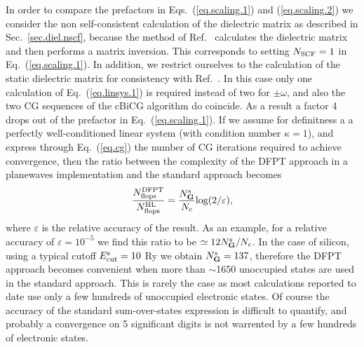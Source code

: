 \documentclass[twocolumn,prb,showpacs,superscriptaddress]{revtex4}
\def\w{\omega}
\def\G{{\bf G}}
\begin{document}
In order to compare the prefactors in Eqs.\ (\ref{eq.scaling.1}) and (\ref{eq.scaling.2})
we consider the non self-consistent calculation of the dielectric matrix as described in Sec.\ \ref{sec.diel.nscf},
because the method of Ref.\  calculates the dielectric matrix and then performs a matrix inversion.
This corresponds to setting $N_{\rm SCF}=1$ in Eq.\ (\ref{eq.scaling.1}). In addition, we restrict ourselves to
the calculation of the static dielectric matrix for consistency with Ref.\ .
In this case only one calculation of Eq.\ (\ref{eq.linsys.1}) is required instead of two for $\pm\w$, 
and also the two CG sequences of the cBiCG algorithm do coincide.
As a result a factor 4 drops out of the prefactor in Eq.\ (\ref{eq.scaling.1}).
If we assume for definitness a a perfectly well-conditioned linear system (with condition number $\kappa=1$),
and express through Eq.\ (\ref{eq.cg}) the number of CG iterations required to achieve convergence,
then the ratio between the complexity of the DFPT approach in a planewaves
implementation and the standard approach becomes
   \begin{equation}\label{eq.ratio.flops}
   \frac{N^{\rm DFPT}_{\rm flops}}{N^{\rm HL}_{\rm flops}} = \frac{N_\G^{\rm s}}{N_c} {\rm log}(2/\varepsilon),
   \end{equation}
where $\varepsilon$ is the relative accuracy of the result.
As an example, for a relative accuracy of $\varepsilon=10^{-5}$ 
we find this ratio to be $\simeq 12 N_\G^{\rm s}/N_c$.
In the case of silicon, using a typical cutoff $E_{\rm cut}^{\rm s}=10$ Ry we obtain $N_\G^{\rm s}=137$, therefore
the DFPT approach becomes convenient when more than $\sim$1650 unoccupied states are used
in the standard approach.
This is rarely the case as most calculations reported to date use only a few hundreds of 
unoccupied electronic states.
Of course the accuracy of the standard sum-over-states expression is difficult to
quantify, and probably a convergence on 5 significant digits is not warrented by a few
hundreds of electronic states. 
\end{document}
